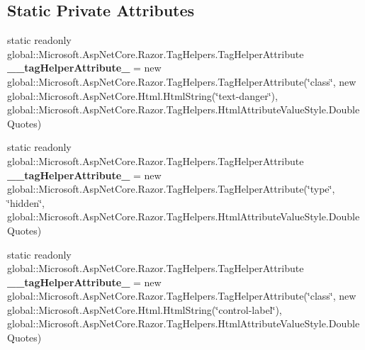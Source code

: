 \subsection*{Static Private Attributes}
\begin{DoxyCompactItemize}
\item 
\mbox{\label{class_asp_net_core_1_1_views___volunteers___edit_abbc80d257c327d63eaef191bda4ee35b}} 
static readonly global\+::\+Microsoft.\+Asp\+Net\+Core.\+Razor.\+Tag\+Helpers.\+Tag\+Helper\+Attribute {\bfseries \+\_\+\+\_\+tag\+Helper\+Attribute\+\_} = new global\+::\+Microsoft.\+Asp\+Net\+Core.\+Razor.\+Tag\+Helpers.\+Tag\+Helper\+Attribute(\char`\"{}class\char`\"{}, new global\+::\+Microsoft.\+Asp\+Net\+Core.\+Html.\+Html\+String(\char`\"{}text-\/danger\char`\"{}), global\+::\+Microsoft.\+Asp\+Net\+Core.\+Razor.\+Tag\+Helpers.\+Html\+Attribute\+Value\+Style.\+Double\+Quotes)
\item 
\mbox{\label{class_asp_net_core_1_1_views___volunteers___edit_a8bc1af3123875d9ac0cc1021e1e71397}} 
static readonly global\+::\+Microsoft.\+Asp\+Net\+Core.\+Razor.\+Tag\+Helpers.\+Tag\+Helper\+Attribute {\bfseries \+\_\+\+\_\+tag\+Helper\+Attribute\+\_} = new global\+::\+Microsoft.\+Asp\+Net\+Core.\+Razor.\+Tag\+Helpers.\+Tag\+Helper\+Attribute(\char`\"{}type\char`\"{}, \char`\"{}hidden\char`\"{}, global\+::\+Microsoft.\+Asp\+Net\+Core.\+Razor.\+Tag\+Helpers.\+Html\+Attribute\+Value\+Style.\+Double\+Quotes)
\item 
\mbox{\label{class_asp_net_core_1_1_views___volunteers___edit_aea2b877ecd3c092db09578aafeb87e38}} 
static readonly global\+::\+Microsoft.\+Asp\+Net\+Core.\+Razor.\+Tag\+Helpers.\+Tag\+Helper\+Attribute {\bfseries \+\_\+\+\_\+tag\+Helper\+Attribute\+\_} = new global\+::\+Microsoft.\+Asp\+Net\+Core.\+Razor.\+Tag\+Helpers.\+Tag\+Helper\+Attribute(\char`\"{}class\char`\"{}, new global\+::\+Microsoft.\+Asp\+Net\+Core.\+Html.\+Html\+String(\char`\"{}control-\/label\char`\"{}), global\+::\+Microsoft.\+Asp\+Net\+Core.\+Razor.\+Tag\+Helpers.\+Html\+Attribute\+Value\+Style.\+Double\+Quotes)
\item 
\mbox{\label{class_asp_net_core_1_1_views___volunteers___edit_a4aed627c412944994a4bd0fee98ad47b}} 

\end{DoxyCompactItemize}
